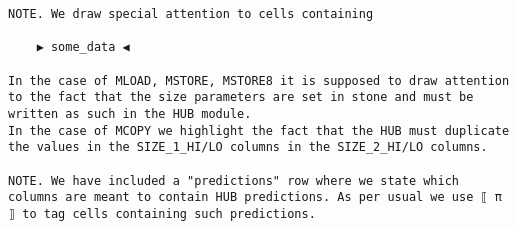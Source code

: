 \documentclass[varwidth=\maxdimen,margin=0.5cm,multi={verbatim}]{standalone}
\begin{document}
\begin{verbatim}
NOTE. We draw special attention to cells containing

    ▶ some_data ◀

In the case of MLOAD, MSTORE, MSTORE8 it is supposed to draw attention to the fact that the size parameters are set in stone and must be written as such in the HUB module.
In the case of MCOPY we highlight the fact that the HUB must duplicate the values in the SIZE_1_HI/LO columns in the SIZE_2_HI/LO columns.

NOTE. We have included a "predictions" row where we state which columns are meant to contain HUB predictions. As per usual we use ⟦ π ⟧ to tag cells containing such predictions.

\end{verbatim}
\end{document}

